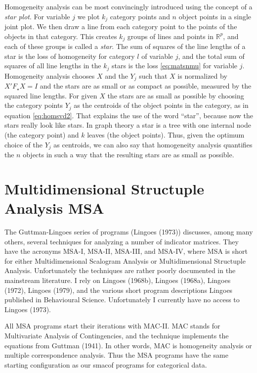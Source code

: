 \documentclass[
  12pt,
]{article}
\begin{document}
Homogeneity analysis can be most convincingly introduced using the concept of a \emph{star plot}. For variable \(j\) we plot \(k_j\) category points and \(n\) object
points in a single joint plot. We then draw a line from each category point to the points of the objects in that category. This creates \(k_j\) groups of
lines and points in \(\mathbb{R}^p\), and each of these groups is called a \emph{star}.
The sum of squares of the line lengths of a star is the loss of homogeneity for category \(l\) of variable \(j\), and the total sum of squares of all line lengths in the \(k_j\) stars is the loss \eqref{eq:matsnmu} for variable \(j\). Homogeneity analysis chooses \(X\) and the \(Y_j\) such that \(X\) is normalized by \(X'F_\star X=I\) and the stars are as small or as compact as possible, measured by the squared line lengths. For given \(X\) the stars are as small as possible by choosing the category points \(Y_j\) as the centroids of the object points in the category, as in equation
\eqref{eq:homsvd2}. That explains the use of the word ``star'', because now the stars really look like stars. In graph theory a star is a tree with one internal node (the category point) and \(k\) leaves (the object points). Thus, given the optimum choice of the \(Y_j\) as centroids, we can also say that homogeneity analysis quantifies the \(n\) objects in such a way that the resulting stars are as small as possible.

\section{Multidimensional Structuple Analysis MSA}\label{multidimensional-structuple-analysis-msa}

The Guttman-Lingoes series of programs (Lingoes (1973))
discusses, among many others, several techniques for analyzing
a number of indicator matrices. They have the acronyms
MSA-I, MSA-II, MSA-III, and MSA-IV, where MSA is short for
either Multidimensional Scalogram Analysis or Multidimensional
Structuple Analysis. Unfortunately the techniques are rather
poorly documented in the mainstream literature. I rely on Lingoes (1968b),
Lingoes (1968a), Lingoes (1972), Lingoes (1979), and the various
short program descriptions Lingoes published in Behavioural Science.
Unfortunately I currently have no access to Lingoes (1973).

All MSA programs start their iterations with MAC-II. MAC stands for
Multivariate Analysis of Contingencies, and the technique implements
the equations from Guttman (1941). In other words, MAC is homogeneity
analysis or multiple correspondence analysis. Thus the MSA
programs have the same starting configuration as our smacof
programs for categorical data.
\end{document}
